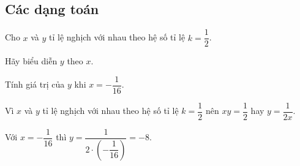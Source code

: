 \subsection{Các dạng toán}
\begin{dang}
	
\end{dang}

\begin{vd}
	Cho $x$ và $y$ tỉ lệ nghịch với nhau theo hệ số tỉ lệ $k=\dfrac{1}{2}$.
	\begin{enumEX}{2}
		\item Hãy biểu diễn $y$ theo $x$.
		\item Tính giá trị của $y$ khi $x=-\dfrac{1}{16}$.
	\end{enumEX}
	\loigiai
	{
		\begin{listEX}
			\item Vì $x$ và $y$ tỉ lệ nghịch với nhau theo hệ số tỉ lệ $k=\dfrac{1}{2}$ nên $xy=\dfrac{1}{2}$ hay $y=\dfrac{1}{2x}$.
			\item Với $x=-\dfrac{1}{16}$ thì $y=\dfrac{1}{2 \cdot\left(-\dfrac{1}{16}\right)} = -8$.
		\end{listEX}
	}
\end{vd}

